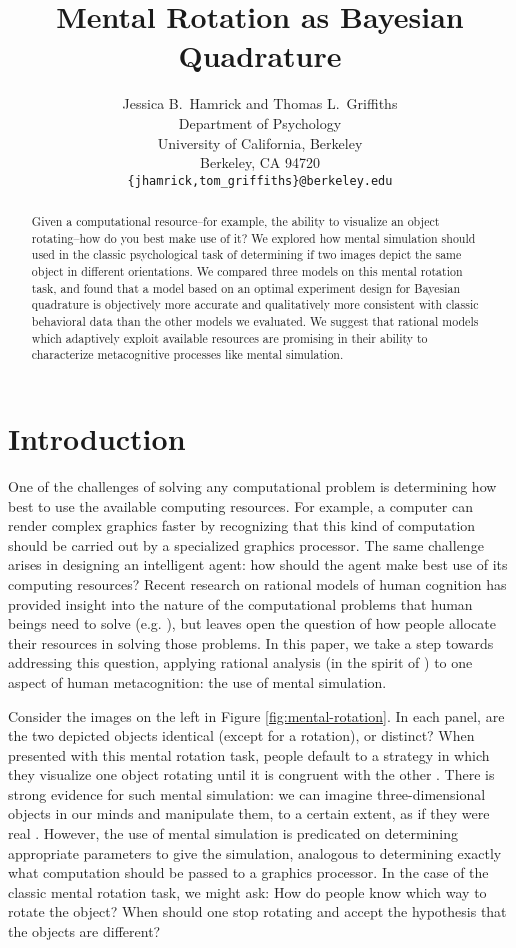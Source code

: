 \documentclass{article} %
\title{Mental Rotation as Bayesian Quadrature}
\author{Jessica B.~Hamrick and Thomas L.~Griffiths\\
  Department of Psychology\\
  University of California, Berkeley\\
  Berkeley, CA 94720\\
  \texttt{\{jhamrick,tom\_griffiths\}@berkeley.edu}}
\begin{document}
\maketitle

\begin{abstract}
  Given a computational resource--for example, the ability to
  visualize an object rotating--how do you best make use of it? We
  explored how mental simulation should used in the classic
  psychological task of determining if two images depict the same
  object in different orientations. We compared three models on this
  mental rotation task, and found that a model based on an optimal
  experiment design for Bayesian quadrature is objectively more
  accurate and qualitatively more consistent with classic behavioral
  data than the other models we evaluated. We suggest that rational
  models which adaptively exploit available resources are promising in
  their ability to characterize metacognitive processes like mental
  simulation.
\end{abstract}

\section{Introduction}

One of the challenges of solving any computational problem is
determining how best to use the available computing resources. For
example, a computer can render complex graphics faster by recognizing
that this kind of computation should be carried out by a specialized
graphics processor. The same challenge arises in designing an
intelligent agent: how should the agent make best use of its computing
resources? Recent research on rational models of human cognition has
provided insight into the nature of the computational problems that
human beings need to solve (e.g. \cite{Chater:1999wp,Griffiths2012a}),
but leaves open the question of how people allocate their resources in
solving those problems. In this paper, we take a step towards
addressing this question, applying rational analysis (in the spirit of
\cite{Marr:1983to,anderson90,Shepard:1987tt}) to one aspect of human
metacognition: the use of mental simulation.

Consider the images on the left in Figure
\ref{fig:mental-rotation}. In each panel, are the two depicted objects
identical (except for a rotation), or distinct? When presented with
this mental rotation task, people default to a strategy in which they
visualize one object rotating until it is congruent with the other
\cite{Shepard1971}. There is strong evidence for such mental
simulation: we can imagine three-dimensional objects in our minds and
manipulate them, to a certain extent, as if they were real
\cite{Kosslyn:2009tj}.  However, the use of mental simulation is
predicated on determining appropriate parameters to give the
simulation, analogous to determining exactly what computation should
be passed to a graphics processor.  In the case of the classic mental
rotation task, we might ask: How do people know which way to rotate
the object?  When should one stop rotating and accept the hypothesis
that the objects are different?
\end{document}
